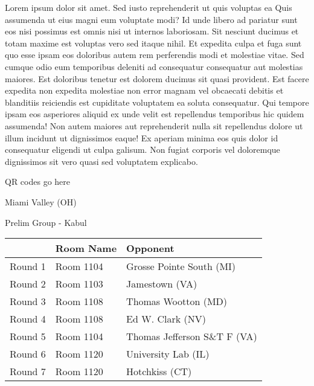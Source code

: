 \documentclass{article}%
\begin{document}
\vspace*{8pt}%
\linebreak%
\newline%
\newline%
Lorem ipsum dolor sit amet. Sed iusto reprehenderit ut quis voluptas ea Quis assumenda ut eius magni eum voluptate modi? Id unde libero ad pariatur sunt eos nisi possimus est omnis nisi ut internos laboriosam. Sit nesciunt ducimus et totam maxime est voluptas vero sed itaque nihil. Et expedita culpa et fuga sunt quo esse ipsam eos doloribus autem rem perferendis modi et molestiae vitae.\newline%
\newline%
Sed cumque odio eum temporibus deleniti ad consequatur consequatur aut molestias maiores. Est doloribus tenetur est dolorem ducimus sit quasi provident. Est facere expedita non expedita molestiae non error magnam vel obcaecati debitis et blanditiis reiciendis est cupiditate voluptatem ea soluta consequatur. Qui tempore ipsam eos asperiores aliquid ex unde velit est repellendus temporibus hic quidem assumenda!\newline%
\newline%
Non autem maiores aut reprehenderit nulla sit repellendus dolore ut illum incidunt ut dignissimos eaque! Ex aperiam minima eos quis dolor id consequatur eligendi ut culpa galisum. Non fugiat corporis vel doloremque dignissimos sit vero quasi sed voluptatem explicabo.\newline%
\newline%
%
\vspace*{30pt}%
\begin{center}%
\begin{Huge}%
QR codes go here%
\end{Huge}%
\end{center}%
\newpage%
%
\begin{center}%
\begin{Huge}%
Miami Valley (OH)%
\end{Huge}%
\vspace*{8pt}%
\linebreak%
\begin{Large}%
Prelim Group {-} Kabul%
\end{Large}%
\end{center}%
\begin{tabularx}{\textwidth}{|c|Y|Y|}%
\hline%
&Room Name&Opponent\\%
\hline%
Round 1&Room 1104&Grosse Pointe South (MI)\\%
Round 2&Room 1103&Jamestown (VA)\\%
Round 3&Room 1108&Thomas Wootton (MD)\\%
Round 4&Room 1108&Ed W. Clark (NV)\\%
Round 5&Room 1104&Thomas Jefferson S\&T F (VA)\\%
Round 6&Room 1120&University Lab (IL)\\%
Round 7&Room 1120&Hotchkiss (CT)\\%
\hline%
\end{tabularx}%
\end{document}

